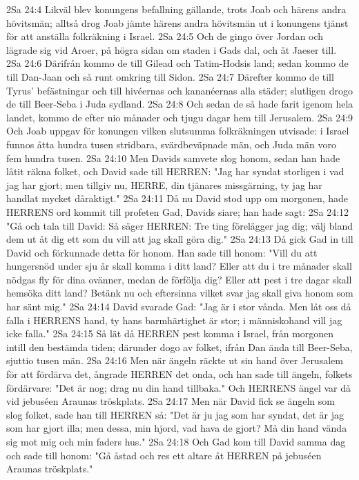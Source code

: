 2Sa 24:4  Likväl blev konungens befallning gällande, trots Joab och härens andra hövitsmän; alltså drog Joab jämte härens andra hövitsmän ut i konungens tjänst för att anställa folkräkning i Israel.
2Sa 24:5  Och de gingo över Jordan och lägrade sig vid Aroer, på högra sidan om staden i Gads dal, och åt Jaeser till.
2Sa 24:6  Därifrån kommo de till Gilead och Tatim-Hodsis land; sedan kommo de till Dan-Jaan och så runt omkring till Sidon.
2Sa 24:7  Därefter kommo de till Tyrus' befästningar och till hivéernas och kananéernas alla städer; slutligen drogo de till Beer-Seba i Juda sydland.
2Sa 24:8  Och sedan de så hade farit igenom hela landet, kommo de efter nio månader och tjugu dagar hem till Jerusalem.
2Sa 24:9  Och Joab uppgav för konungen vilken slutsumma folkräkningen utvisade: i Israel funnos åtta hundra tusen stridbara, svärdbeväpnade män, och Juda män voro fem hundra tusen.
2Sa 24:10  Men Davids samvete slog honom, sedan han hade låtit räkna folket, och David sade till HERREN: "Jag har syndat storligen i vad jag har gjort; men tillgiv nu, HERRE, din tjänares missgärning, ty jag har handlat mycket dåraktigt."
2Sa 24:11  Då nu David stod upp om morgonen, hade HERRENS ord kommit till profeten Gad, Davids siare; han hade sagt:
2Sa 24:12  "Gå och tala till David: Så säger HERREN: Tre ting förelägger jag dig; välj bland dem ut åt dig ett som du vill att jag skall göra dig."
2Sa 24:13  Då gick Gad in till David och förkunnade detta för honom. Han sade till honom: "Vill du att hungersnöd under sju år skall komma i ditt land? Eller att du i tre månader skall nödgas fly för dina ovänner, medan de förfölja dig? Eller att pest i tre dagar skall hemsöka ditt land? Betänk nu och eftersinna vilket svar jag skall giva honom som har sänt mig."
2Sa 24:14  David svarade Gad: "Jag är i stor vånda. Men låt oss då falla i HERRENS hand, ty hans barmhärtighet är stor; i människohand vill jag icke falla."
2Sa 24:15  Så lät då HERREN pest komma i Israel, från morgonen intill den bestämda tiden; därunder dogo av folket, ifrån Dan ända till Beer-Seba, sjuttio tusen män.
2Sa 24:16  Men när ängeln räckte ut sin hand över Jerusalem för att fördärva det, ångrade HERREN det onda, och han sade till ängeln, folkets fördärvare: "Det är nog; drag nu din hand tillbaka." Och HERRENS ängel var då vid jebuséen Araunas tröskplats.
2Sa 24:17  Men när David fick se ängeln som slog folket, sade han till HERREN så: "Det är ju jag som har syndat, det är jag som har gjort illa; men dessa, min hjord, vad hava de gjort? Må din hand vända sig mot mig och min faders hus."
2Sa 24:18  Och Gad kom till David samma dag och sade till honom: "Gå åstad och res ett altare åt HERREN på jebuséen Araunas tröskplats."
